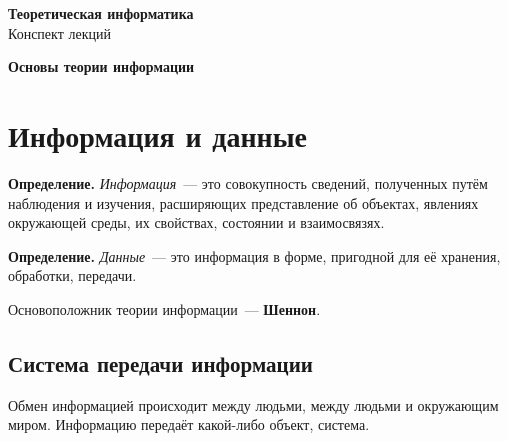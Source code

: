 \documentclass[a4paper,11pt]{article}
\begin{document}
\begin{center}
{\LARGE\bfseries\color{secred}Теоретическая информатика}\\[3pt]
{\large Конспект лекций}
\end{center}
\vspace{-2mm}

\tableofcontents
\newpage


\begin{center}\textbf{Основы теории информации}\end{center}

\section{Информация и данные}

\begin{opr}
\textbf{Определение.} \emph{Информация}~--- это совокупность сведений, полученных путём наблюдения
и изучения, расширяющих представление об объектах, явлениях окружающей среды,
их свойствах, состоянии и взаимосвязях.
\end{opr}

\begin{opr}
\textbf{Определение.} \emph{Данные}~--- это информация в форме, пригодной для её хранения,
обработки, передачи.
\end{opr}

Основоположник теории информации~--- \textbf{Шеннон}.

\subsection{Система передачи информации}

Обмен информацией происходит между людьми, между людьми и окружающим миром.
Информацию передаёт какой-либо объект, система.

\begin{center}
\end{center}
\end{document}
